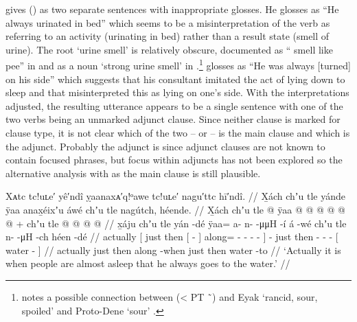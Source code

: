 \citeauthor{swanton:1909} gives (\lastx) as two separate sentences with inappropriate glosses.
He glosses  as “He always urinated in bed” which seems to be a misinterpretation of the verb as referring to an activity (urinating in bed) rather than a result state (smell of urine).
The root  ‘urine smell’ is relatively obscure, documented as “ smell like pee” in \cite[77]{leer:1978b} and as a noun  ‘strong urine smell’ in \cite[\textsc{t}·34]{leer:2001}.\footnote{\textcite[77]{leer:1978b} notes a possible connection between  (< PT  \~\ ) and Eyak  ‘rancid, sour, spoiled’ \parencite[1700]{krauss:1970} and Proto-Dene  ‘sour’ \parencite[84/187]{leer:1996a}.} \citeauthor{swanton:1909} glosses  as “He was always [turned] on his side” which suggests that his consultant imitated the act of lying down to sleep and that \citeauthor{swanton:1909} misinterpreted this as lying on one’s side.
With the interpretations adjusted, the resulting utterance appears to be a single sentence with one of the two verbs being an unmarked adjunct clause.
Since neither clause is marked for clause type, it is not clear which of the two –  or  – is the main clause and which is the adjunct.
Probably the adjunct is  since adjunct clauses are not known to contain focused phrases, but focus within adjuncts has not been explored so the alternative analysis with  as the main clause is still plausible.

\ex\label{ex:93-8-sleeping-bathe}%
%
\begingl
	\glpreamble	Xᴀtc tc!uʟe′ yê′ndî ỵaanaxᴀ′q!ᵒawe tc!uʟe′ nagu′ttc hī′ndî. //
	\glpreamble	X̱ách chʼu tle yánde ÿaa anax̱éixʼu áwé chʼu tle nagútch, héende. //
	\gla	X̱ách 
		{} chʼu tle
			{}  @ {} {} 
			ÿaa @  @ {} @ {} @ {} @ {} {}
		 @ {} +
		chʼu tle  @ {} @ {} @ {}
		{}  @ {} {} //
	\glb	x̱áju
		{} chʼu tle
			{} yán -dé {}
			ÿaa= a- n-  -μμH -í {}
		á -wé
		chʼu tle
		n-  -μH -ch
		{} héen -dé {} //
	\glc	actually
		{}[ just then
			{}[  - {}]
			along= - -  - - {}]
		 -
		just then
		-  - -
		{}[ water - {}] //
	\gld	actually
		{} just then
			{}  {} {}
			along  {} {} {} -when {}
		 {}
		just then
		 {} {} {}
		{} water -to {} //
	\glft	‘Actually it is when people are almost asleep that he always goes to the water.’
		//
\endgl
\xe

